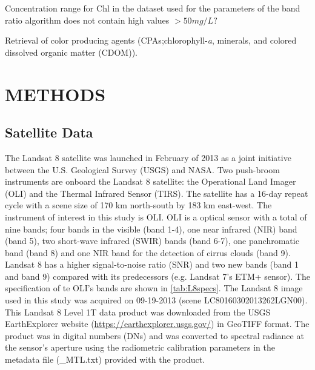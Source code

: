 \documentclass[]{spie}  %
\begin{document}
Concentration range for Chl in the dataset used for the parameters of the band ratio algorithm does not contain high values $> 50mg/L?$

Retrieval of color producing agents (CPAs;chlorophyll-{\it a}, minerals, and colored dissolved organic matter (CDOM)).

\section{METHODS}
\label{sec:methods}
\subsection{Satellite Data}
The Landsat 8 satellite was launched in February of 2013 as a joint initiative between the U.S. Geological Survey (USGS) and NASA. Two push-broom instruments are onboard the Landsat 8 satellite: the Operational Land Imager (OLI) and the Thermal Infrared Sensor (TIRS). The satellite has a 16-day repeat cycle with a scene size of 170 km north-south by 183 km east-west. The instrument of interest in this study is OLI. OLI is a optical sensor with a total of nine bands; four bands in the visible (band 1-4), one near infrared (NIR) band (band 5), two short-wave infrared (SWIR) bands (band 6-7), one panchromatic band (band 8) and one NIR band for the detection of cirrus clouds (band 9). Landsat 8 has a higher signal-to-noise ratio (SNR) and two new bands (band 1 and band 9) compared with its predecessors (e.g. Landsat 7’s ETM+ sensor). The specification of te OLI's bands are shown in \autoref{tab:L8specs}. The Landsat 8 image used in this study was acquired on 09-19-2013 (scene LC80160302013262LGN00). This Landsat 8 Level 1T data product was downloaded from the USGS EarthExplorer website (\url{https://earthexplorer.usgs.gov/}) in GeoTIFF format. The product was in digital numbers (DNs) and was converted to spectral radiance at the sensor's aperture using the radiometric calibration parameters in the metadata file (\_MTL.txt) provided with the product.
\end{document}
